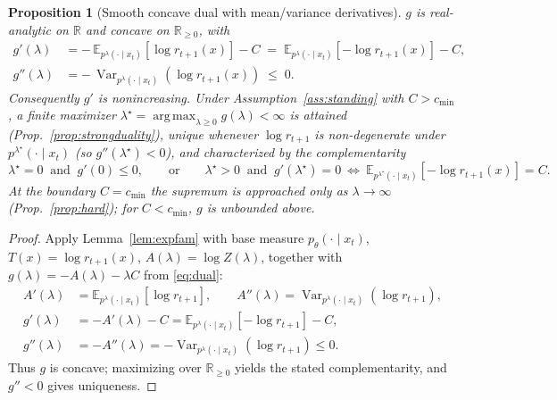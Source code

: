 \documentclass{article}
\newtheorem{proposition}{Proposition}
\DeclareMathOperator{\Var}{Var}
\DeclareMathOperator*{\argmax}{arg\,max}
\newcommand{\E}{\mathbb{E}}
\newcommand{\R}{\mathbb{R}}
\newcommand{\lstar}{\lambda^{\star}}
\newcommand{\qlam}{p^{\lambda}(\cdot\mid x_t)}
\begin{document}
\begin{proposition}[Smooth concave dual with mean/variance derivatives]
\label{prop:dual}
$g$ is real-analytic on $\R$ and concave on $\R_{\ge0}$, with
\begin{align}
g'(\lambda) &= -\,\E_{\qlam}\!\left[\log r_{t+1}(x)\right]-C
           \;=\;\E_{\qlam}\!\left[-\log r_{t+1}(x)\right]-C,
\label{eq:gprime}\\
g''(\lambda) &= -\,\Var_{\qlam}\!\left(\log r_{t+1}(x)\right)\;\le\;0.
\label{eq:gsecond}
\end{align}
Consequently $g'$ is nonincreasing. Under Assumption~\ref{ass:standing} with $C>c_{\min}$, a \emph{finite} maximizer $\lstar=\argmax_{\lambda\ge0}g(\lambda)<\infty$ is attained (Prop.~\ref{prop:strongduality}), unique whenever $\log r_{t+1}$ is non-degenerate under $p^{\lstar}(\cdot\mid x_t)$ (so $g''(\lstar)<0$), and characterized by the complementarity
\begin{equation}
\lstar=0 \ \text{ and }\ g'(0)\le 0,
\qquad\text{or}\qquad
\lstar>0 \ \text{ and }\ g'(\lstar)=0\ \Leftrightarrow\ \E_{p^{\lstar}(\cdot\mid x_t)}[-\log r_{t+1}(x)]=C.
\end{equation}
At the boundary $C=c_{\min}$ the supremum is approached only as $\lambda\to\infty$ (Prop.~\ref{prop:hard}); for $C<c_{\min}$, $g$ is unbounded above.
\end{proposition}
\begin{proof}
Apply Lemma~\ref{lem:expfam} with base measure $p_\theta(\cdot\mid x_t)$, $T(x)=\log r_{t+1}(x)$, $A(\lambda)=\log Z(\lambda)$, together with $g(\lambda)=-A(\lambda)-\lambda C$ from \eqref{eq:dual}:
\begin{align*}
A'(\lambda)&=\E_{\qlam}[\log r_{t+1}],\qquad A''(\lambda)=\Var_{\qlam}(\log r_{t+1}),\\
g'(\lambda)&=-A'(\lambda)-C=\E_{\qlam}[-\log r_{t+1}]-C,\\
g''(\lambda)&=-A''(\lambda)=-\Var_{\qlam}(\log r_{t+1})\le0.
\end{align*}
Thus $g$ is concave; maximizing over $\R_{\ge0}$ yields the stated complementarity, and $g''<0$ gives uniqueness.
\end{proof}
\end{document}
